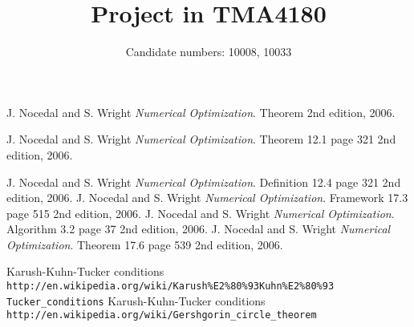 \documentclass[a4paper,12pt]{article}
\begin{document}
\title{Project in TMA4180}
\author{Candidate numbers: 10008, 10033}
\maketitle



%
%


\begin{thebibliography}{9}

  J. Nocedal and S. Wright
  \emph{Numerical Optimization}.
  Theorem 
  2nd edition,
  2006.
  
  J. Nocedal and S. Wright
  \emph{Numerical Optimization}.
  Theorem 12.1 page 321
  2nd edition,
  2006.

  J. Nocedal and S. Wright
  \emph{Numerical Optimization}.
  Definition 12.4 page 321
  2nd edition,
  2006.
  J. Nocedal and S. Wright
  \emph{Numerical Optimization}.
  Framework 17.3 page 515
  2nd edition,
  2006.
  J. Nocedal and S. Wright
  \emph{Numerical Optimization}.
  Algorithm 3.2 page 37
  2nd edition,
  2006.   
  J. Nocedal and S. Wright
  \emph{Numerical Optimization}.
  Theorem 17.6 page 539
  2nd edition,
  2006.  
  
    Karush-Kuhn-Tucker conditions\\
    \texttt{http://en.wikipedia.org/wiki/Karush\%E2\%80\%93Kuhn\%E2\%80\%93\\Tucker\_conditions}
    Karush-Kuhn-Tucker conditions\\
    \texttt{http://en.wikipedia.org/wiki/Gershgorin\_circle\_theorem}


\end{thebibliography}


%
%
%
%
%
%
%
%
\end{document}
